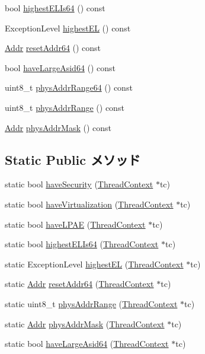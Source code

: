 \begin{DoxyCompactItemize}
\item 
bool \hyperlink{classArmSystem_a87a962080af194d9996167c494c30ff1}{highestELIs64} () const 
\item 
ExceptionLevel \hyperlink{classArmSystem_ac97823fdad4c16dec297e6e92887ba5f}{highestEL} () const 
\item 
\hyperlink{base_2types_8hh_af1bb03d6a4ee096394a6749f0a169232}{Addr} \hyperlink{classArmSystem_ab3ee6a4f5ccf871a1ec729401efa6df4}{resetAddr64} () const 
\item 
bool \hyperlink{classArmSystem_a47958664a46869f3fb4f9b043da32be5}{haveLargeAsid64} () const 
\item 
uint8\_\-t \hyperlink{classArmSystem_a4ab7e9eea0ca7202f2f83655f5dd1571}{physAddrRange64} () const 
\item 
uint8\_\-t \hyperlink{classArmSystem_aecc15d8d848b1cee0bbe7dac86d01ec1}{physAddrRange} () const 
\item 
\hyperlink{base_2types_8hh_af1bb03d6a4ee096394a6749f0a169232}{Addr} \hyperlink{classArmSystem_a09d9a6ae0ebdd88ccfccc513e2157aef}{physAddrMask} () const 
\end{DoxyCompactItemize}
\subsection*{Static Public メソッド}
\begin{DoxyCompactItemize}
\item 
static bool \hyperlink{classArmSystem_abe179837e5b071fc8f9d6896bd7ff1e6}{haveSecurity} (\hyperlink{classThreadContext}{ThreadContext} $\ast$tc)
\item 
static bool \hyperlink{classArmSystem_a1f64894290af14b147eda414e6588005}{haveVirtualization} (\hyperlink{classThreadContext}{ThreadContext} $\ast$tc)
\item 
static bool \hyperlink{classArmSystem_aaab5472ead2be1873fa192e1f196b78b}{haveLPAE} (\hyperlink{classThreadContext}{ThreadContext} $\ast$tc)
\item 
static bool \hyperlink{classArmSystem_a94d9b71637c8e790ebb6124498fd1252}{highestELIs64} (\hyperlink{classThreadContext}{ThreadContext} $\ast$tc)
\item 
static ExceptionLevel \hyperlink{classArmSystem_afc4618ef69b2b5acf5723126b73ef1ac}{highestEL} (\hyperlink{classThreadContext}{ThreadContext} $\ast$tc)
\item 
static \hyperlink{base_2types_8hh_af1bb03d6a4ee096394a6749f0a169232}{Addr} \hyperlink{classArmSystem_a04b1e5b5c4e565e6250ef5a38537205a}{resetAddr64} (\hyperlink{classThreadContext}{ThreadContext} $\ast$tc)
\item 
static uint8\_\-t \hyperlink{classArmSystem_aa5d9f7bf62fd42274745654e63b0fbf8}{physAddrRange} (\hyperlink{classThreadContext}{ThreadContext} $\ast$tc)
\item 
static \hyperlink{base_2types_8hh_af1bb03d6a4ee096394a6749f0a169232}{Addr} \hyperlink{classArmSystem_a9b41efe55e6e2a1ee6f8a44325c8213e}{physAddrMask} (\hyperlink{classThreadContext}{ThreadContext} $\ast$tc)
\item 
static bool \hyperlink{classArmSystem_a7a86a1f7da253ac26a3bc9891e49e6cf}{haveLargeAsid64} (\hyperlink{classThreadContext}{ThreadContext} $\ast$tc)
\end{DoxyCompactItemize}
